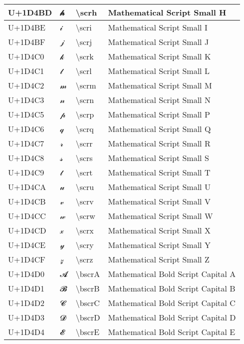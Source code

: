 \begin{table}[h]
\begin{tabulary}{\linewidth}{|L|L|L|L|}
\hline
U+1D4BD & 𝒽 & {\textbackslash}scrh & Mathematical Script Small H \\
\hline
U+1D4BE & 𝒾 & {\textbackslash}scri & Mathematical Script Small I \\
\hline
U+1D4BF & 𝒿 & {\textbackslash}scrj & Mathematical Script Small J \\
\hline
U+1D4C0 & 𝓀 & {\textbackslash}scrk & Mathematical Script Small K \\
\hline
U+1D4C1 & 𝓁 & {\textbackslash}scrl & Mathematical Script Small L \\
\hline
U+1D4C2 & 𝓂 & {\textbackslash}scrm & Mathematical Script Small M \\
\hline
U+1D4C3 & 𝓃 & {\textbackslash}scrn & Mathematical Script Small N \\
\hline
U+1D4C5 & 𝓅 & {\textbackslash}scrp & Mathematical Script Small P \\
\hline
U+1D4C6 & 𝓆 & {\textbackslash}scrq & Mathematical Script Small Q \\
\hline
U+1D4C7 & 𝓇 & {\textbackslash}scrr & Mathematical Script Small R \\
\hline
U+1D4C8 & 𝓈 & {\textbackslash}scrs & Mathematical Script Small S \\
\hline
U+1D4C9 & 𝓉 & {\textbackslash}scrt & Mathematical Script Small T \\
\hline
U+1D4CA & 𝓊 & {\textbackslash}scru & Mathematical Script Small U \\
\hline
U+1D4CB & 𝓋 & {\textbackslash}scrv & Mathematical Script Small V \\
\hline
U+1D4CC & 𝓌 & {\textbackslash}scrw & Mathematical Script Small W \\
\hline
U+1D4CD & 𝓍 & {\textbackslash}scrx & Mathematical Script Small X \\
\hline
U+1D4CE & 𝓎 & {\textbackslash}scry & Mathematical Script Small Y \\
\hline
U+1D4CF & 𝓏 & {\textbackslash}scrz & Mathematical Script Small Z \\
\hline
U+1D4D0 & 𝓐 & {\textbackslash}bscrA & Mathematical Bold Script Capital A \\
\hline
U+1D4D1 & 𝓑 & {\textbackslash}bscrB & Mathematical Bold Script Capital B \\
\hline
U+1D4D2 & 𝓒 & {\textbackslash}bscrC & Mathematical Bold Script Capital C \\
\hline
U+1D4D3 & 𝓓 & {\textbackslash}bscrD & Mathematical Bold Script Capital D \\
\hline
U+1D4D4 & 𝓔 & {\textbackslash}bscrE & Mathematical Bold Script Capital E \\

\end{tabulary}
\end{table}

